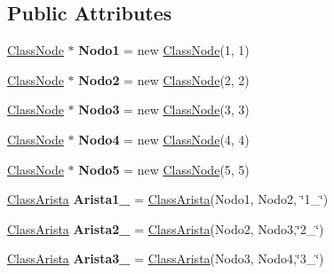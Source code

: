 \subsection*{Public Attributes}
\begin{DoxyCompactItemize}
\item 
\mbox{\label{class_grafo_a82bcd52dfaca484b480898965791cd39}} 
\hyperlink{class_class_node}{Class\+Node} $\ast$ {\bfseries Nodo1} = new \hyperlink{class_class_node}{Class\+Node}(1, 1)
\item 
\mbox{\label{class_grafo_aec40c758df79cb1d44173317edd23e7c}} 
\hyperlink{class_class_node}{Class\+Node} $\ast$ {\bfseries Nodo2} = new \hyperlink{class_class_node}{Class\+Node}(2, 2)
\item 
\mbox{\label{class_grafo_a72677ba5c53a48f69421fac847c3484e}} 
\hyperlink{class_class_node}{Class\+Node} $\ast$ {\bfseries Nodo3} = new \hyperlink{class_class_node}{Class\+Node}(3, 3)
\item 
\mbox{\label{class_grafo_adbab12f85017195ed784fb59c06141f9}} 
\hyperlink{class_class_node}{Class\+Node} $\ast$ {\bfseries Nodo4} = new \hyperlink{class_class_node}{Class\+Node}(4, 4)
\item 
\mbox{\label{class_grafo_af17e4f26c857449643855d83c9bcab25}} 
\hyperlink{class_class_node}{Class\+Node} $\ast$ {\bfseries Nodo5} = new \hyperlink{class_class_node}{Class\+Node}(5, 5)
\item 
\mbox{\label{class_grafo_a4fa6cd6cd1f60b2ea726e1f130af1709}} 
\hyperlink{class_class_arista}{Class\+Arista} {\bfseries Arista1\+\_} = \hyperlink{class_class_arista}{Class\+Arista}(Nodo1, Nodo2, \char`\"{}1\+\_\char`\"{})
\item 
\mbox{\label{class_grafo_ab021656de1c879b743514b74338e92a0}} 
\hyperlink{class_class_arista}{Class\+Arista} {\bfseries Arista2\+\_} = \hyperlink{class_class_arista}{Class\+Arista}(Nodo2, Nodo3,\char`\"{}2\+\_\char`\"{})
\item 
\mbox{\label{class_grafo_aae6f12f7b29c6771a858a50c4e00f6c0}} 
\hyperlink{class_class_arista}{Class\+Arista} {\bfseries Arista3\+\_} = \hyperlink{class_class_arista}{Class\+Arista}(Nodo3, Nodo4,\char`\"{}3\+\_\char`\"{})

\end{DoxyCompactItemize}

